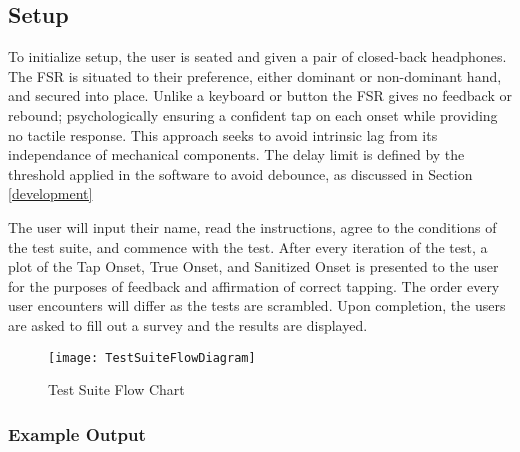 \subsection{Setup} \label{testSetup}
To initialize setup, the user is seated and given a pair of closed-back headphones. The FSR is situated to their preference, either dominant or non-dominant hand, and secured into place. Unlike a keyboard or button the FSR gives no feedback or rebound; psychologically ensuring a confident tap on each onset while providing no tactile response. This approach seeks to avoid intrinsic lag from its independance of mechanical components. The delay limit is defined by the threshold applied in the software to avoid debounce, as discussed in Section \ref{development}

The user will input their name, read the instructions, agree to the conditions of the test suite, and commence with the test. After every iteration of the test, a plot of the Tap Onset, True Onset, and Sanitized Onset is presented to the user for the purposes of feedback and affirmation of correct tapping. The order every user encounters will differ as the tests are scrambled. Upon completion, the users are asked to fill out a survey and the results are displayed.

\begin{figure}[H]
    \centering
    \texttt{[image: TestSuiteFlowDiagram]}
    \caption{Test Suite Flow Chart}
    \label{fig:TestSuiteFlowDiagram}
\end{figure}

\subsubsection{Example Output}
